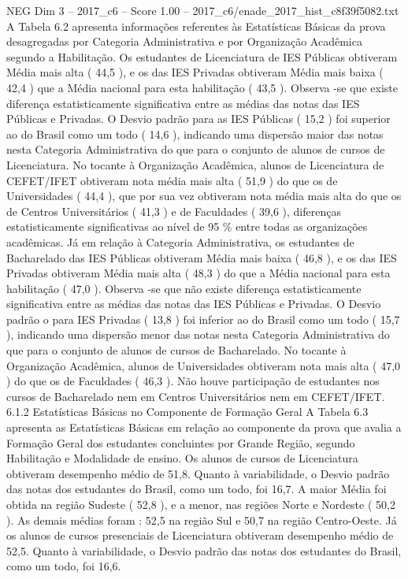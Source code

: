 \begin{textsample}{NEG Dim 3 – 2017\_c6 – Score 1.00 – 2017\_c6/enade\_2017\_hist\_c8f39f5082.txt}
A Tabela 6.2 apresenta informações referentes às Estatísticas Básicas da prova desagregadas por Categoria Administrativa e por Organização Acadêmica segundo a Habilitação.
Os estudantes de Licenciatura de IES Públicas obtiveram Média mais alta ( 44,5 ), e os das IES Privadas obtiveram Média mais baixa ( 42,4 ) que a Média nacional para esta habilitação ( 43,5 ).
Observa -se que existe diferença estatisticamente significativa entre as médias das notas das IES Públicas e Privadas.
O Desvio padrão para as IES Públicas ( 15,2 ) foi superior ao do Brasil como um todo ( 14,6 ), indicando uma dispersão maior das notas nesta Categoria Administrativa do que para o conjunto de alunos de cursos de Licenciatura.
No tocante à Organização Acadêmica, alunos de Licenciatura de CEFET/IFET obtiveram nota média mais alta ( 51,9 ) do que os de Universidades ( 44,4 ), que por sua vez obtiveram nota média mais alta do que os de Centros Universitários ( 41,3 ) e de Faculdades ( 39,6 ), diferenças estatisticamente significativas ao nível de 95 \% entre todas as organizações acadêmicas.
Já em relação à Categoria Administrativa, os estudantes de Bacharelado das IES Públicas obtiveram Média mais baixa ( 46,8 ), e os das IES Privadas obtiveram Média mais alta ( 48,3 ) do que a Média nacional para esta habilitação ( 47,0 ).
Observa -se que não existe diferença estatisticamente significativa entre as médias das notas das IES Públicas e Privadas.
O Desvio padrão o para IES Privadas ( 13,8 ) foi inferior ao do Brasil como um todo ( 15,7 ), indicando uma dispersão menor das notas nesta Categoria Administrativa do que para o conjunto de alunos de cursos de Bacharelado.
No tocante à Organização Acadêmica, alunos de Universidades obtiveram nota mais alta ( 47,0 ) do que os de Faculdades ( 46,3 ).
Não houve participação de estudantes nos cursos de Bacharelado nem em Centros Universitários nem em CEFET/IFET. 6.1.2 Estatísticas Básicas no Componente de Formação Geral A Tabela 6.3 apresenta as Estatísticas Básicas em relação ao componente da prova que avalia a Formação Geral dos estudantes concluintes por Grande Região, segundo Habilitação e Modalidade de ensino.
Os alunos de cursos de Licenciatura obtiveram desempenho médio de 51,8.
Quanto à variabilidade, o Desvio padrão das notas dos estudantes do Brasil, como um todo, foi 16,7.
A maior Média foi obtida na região Sudeste ( 52,8 ), e a menor, nas regiões Norte e Nordeste ( 50,2 ).
As demais médias foram : 52,5 na região Sul e 50,7 na região Centro-Oeste.
Já os alunos de cursos presenciais de Licenciatura obtiveram desempenho médio de 52,5.
Quanto à variabilidade, o Desvio padrão das notas dos estudantes do Brasil, como um todo, foi 16,6.

\end{textsample}
